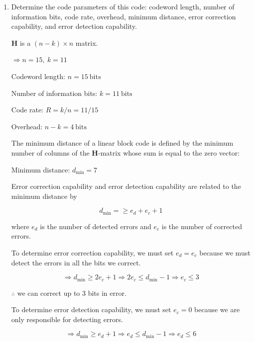 \documentclass[fleqn]{article}
\begin{document}
\begin{enumerate}
		\begin{enumerate}
			\item Determine the code parameters of this code: codeword length, number of information bits, code rate, overhead, minimum distance, error correction capability, and error detection capability.
			
			$\mathbf{H}$ is a $(n-k) \times n$ matrix.

			$\Rightarrow n = 15,\ k = 11$
						
			Codeword length: $n = 15\ \text{bits}$
			
			Number of information bits: $k = 11\ \text{bits}$
			
			Code rate: $R = k/n = 11/15$
			
			Overhead: $n - k = 4\ \text{bits}$
			
			The minimum distance of a linear block code is defined by the minimum number of columns of the $\mathbf{H}$-matrix whose sum is equal to the zero vector:
			
			Minimum distance: $d_\text{min} = 7$
			
			Error correction capability and error detection capability are related to the minimum distance by
			
			\begin{equation*}
				d_{\text{min}} = \geq e_d + e_c + 1
			\end{equation*}
			
			where $e_d$ is the number of detected errors and $e_c$ is the number of corrected errors.
			
			To determine error correction capability, we must set $e_d = e_c$ because we must detect the errors in all the bits we correct.
			
			\begin{equation*}
				\Rightarrow d_{\text{min}} \geq 2e_c + 1 \Rightarrow 2e_c \leq d_{\text{min}} - 1 \Rightarrow e_c \leq 3
			\end{equation*}
			
			$\therefore$ we can correct up to 3 bits in error.
			
			To determine error detection capability, we must set $e_c = 0$ because we are only responsible for detecting errors.
			
			\begin{equation*}
				\Rightarrow d_{\text{min}} \geq e_d + 1 \Rightarrow e_d \leq d_{\text{min}} - 1 \Rightarrow e_d \leq 6
			\end{equation*}
			

\end{enumerate}
\end{enumerate}
\end{document}
